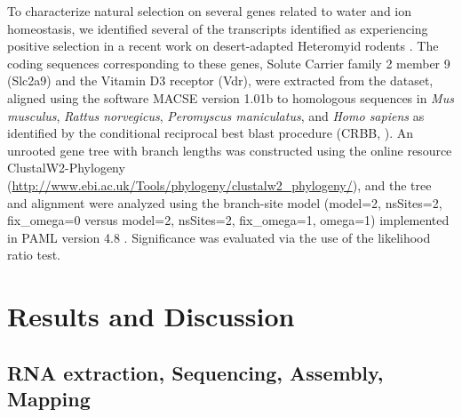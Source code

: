\documentclass[12pt]{article}
\begin{document}
To characterize natural selection on several genes related to water and ion homeostasis, we identified several of the transcripts identified as experiencing positive selection in a recent work on desert-adapted Heteromyid rodents \citep{Marra:2014de}. The coding sequences corresponding to these genes, Solute Carrier family 2 member 9  (Slc2a9) and the Vitamin D3 receptor (Vdr), were extracted from the dataset, aligned using the software MACSE version 1.01b \citep{Ranwez:2011kj} to homologous sequences in \textit{Mus musculus}, \textit{Rattus norvegicus}, \textit{Peromyscus maniculatus}, and \textit{Homo sapiens} as identified by the conditional reciprocal best blast procedure (CRBB, \citep{Aubry:2014en}). An unrooted gene tree with branch lengths was constructed using the online resource ClustalW2-Phylogeny (\url{http://www.ebi.ac.uk/Tools/phylogeny/clustalw2_phylogeny/}), and the tree and alignment were analyzed using the branch-site model (model=2, nsSites=2, fix\_omega=0 versus model=2, nsSites=2, fix\_omega=1, omega=1)  implemented in PAML version 4.8 \citep{Yang:2011bm,Yang:2007ki}. Significance was evaluated via the use of the likelihood ratio test. \\   


\section*{Results and Discussion}

\subsection*{RNA extraction, Sequencing, Assembly, Mapping}
\end{document}
